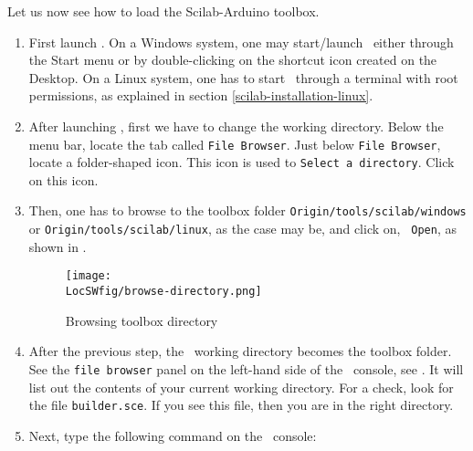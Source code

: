 Let us now see how to load the Scilab-Arduino toolbox. 
\begin{enumerate}
      \item First launch \scilab. On a Windows system, one may start/launch
            \scilab\ either through the Start menu or by double-clicking on the
            shortcut icon created on the Desktop. On a Linux system, one has to
            start \scilab\ through a terminal with root permissions, as
            explained in section \ref{scilab-installation-linux}.
      \item After launching \scilab, first we have to change the working
            directory. Below the menu bar, locate the tab called {\tt File Browser}. 
            Just below {\tt File Browser}, locate a folder-shaped icon. 
            This icon is used to {\tt Select a directory}. Click on this icon.   
      \item Then, one has to browse to the toolbox folder
                  {\tt Origin/tools/scilab/windows} or {\tt Origin/tools/scilab/linux}, as the case
            may be, and click on, {\tt
                        Open}, as shown in .
            \begin{figure}
                  \centering
                  \texttt{[image: \\LocSWfig/browse-directory.png]}
                  \caption{Browsing toolbox directory}
                  \label{scilab-browse}
            \end{figure}
      \item After the previous step, the \scilab\ working directory becomes
            the toolbox folder.  See the {\tt file browser} panel on the
            left-hand side of the \scilab\ console, see .  It
            will list out the contents of your current working directory. For a
            check, look for the file {\tt builder.sce}.  If you see this file,
            then you are in the right directory.
      \item Next, type the following command on the \scilab\ console: {\tt
}
\end{enumerate}
